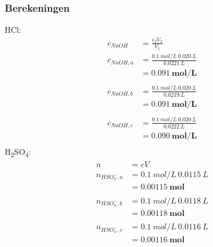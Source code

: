 \documentclass[11pt]{report}
\begin{document}
\subsubsection{Berekeningen}
\begin{multicols}{2}
    HCl:\\
    \begin{equation*}
        \begin{split}
            c_{NaOH} &= \frac{c_2V_2}{V_1}\\
            c_{NaOH,a} &= \frac{0.1\ mol/L\ 0.020\ L}{0.0221\ L}\\
                    &= \mathbf{0.091\ mol/L}\\\\
            c_{NaOH,b} &= \frac{0.1\ mol/L\ 0.020\ L}{0.0219\ L}\\
                    &= \mathbf{0.091\ mol/L}\\\\
            c_{NaOH,c} &= \frac{0.1\ mol/L\ 0.020\ L}{0.0222\ L}\\
                    &= \mathbf{0.090\ mol/L}\\
        \end{split}
    \end{equation*}
\break
    H\textsubscript{2}SO\textsubscript{4}:\\
    \begin{equation*}
        \begin{split}
            n &= cV\\
            n_{HSO_4^-,a} &= 0.1\ mol/L\ 0.0115\ L\\
                &= \mathbf{0.00115\ mol}\\\\
            n_{HSO_4^-,b} &= 0.1\ mol/L\ 0.0118\ L\\
                &= \mathbf{0.00118\ mol}\\\\
            n_{HSO_4^-,c} &= 0.1\ mol/L\ 0.0116\ L\\
                &= \mathbf{0.00116\ mol}\\\\
        \end{split}
    \end{equation*}
\end{multicols}
\end{document}
